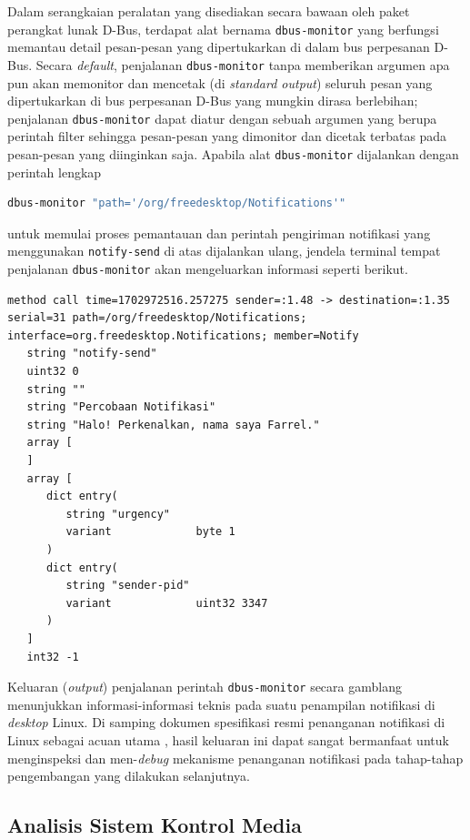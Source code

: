 Dalam serangkaian peralatan yang disediakan secara bawaan oleh paket perangkat lunak D-Bus, terdapat alat bernama \verb|dbus-monitor| yang berfungsi memantau detail pesan-pesan yang dipertukarkan di dalam bus perpesanan D-Bus. Secara \textit{default}, penjalanan \verb|dbus-monitor| tanpa memberikan argumen apa pun akan memonitor dan mencetak (di \textit{standard output}) seluruh pesan yang dipertukarkan di bus perpesanan D-Bus yang mungkin dirasa berlebihan; penjalanan \verb|dbus-monitor| dapat diatur dengan sebuah argumen yang berupa perintah filter sehingga pesan-pesan yang dimonitor dan dicetak terbatas pada pesan-pesan yang diinginkan saja. Apabila alat \verb|dbus-monitor| dijalankan dengan perintah lengkap
\begin{lstlisting}[language=bash]
    dbus-monitor "path='/org/freedesktop/Notifications'"
\end{lstlisting}
untuk memulai proses pemantauan dan perintah pengiriman notifikasi yang menggunakan \verb|notify-send| di atas dijalankan ulang, jendela terminal tempat penjalanan \verb|dbus-monitor| akan mengeluarkan informasi seperti berikut.
\begin{lstlisting}
method call time=1702972516.257275 sender=:1.48 -> destination=:1.35 serial=31 path=/org/freedesktop/Notifications; interface=org.freedesktop.Notifications; member=Notify
   string "notify-send"
   uint32 0
   string ""
   string "Percobaan Notifikasi"
   string "Halo! Perkenalkan, nama saya Farrel."
   array [
   ]
   array [
      dict entry(
         string "urgency"
         variant             byte 1
      )
      dict entry(
         string "sender-pid"
         variant             uint32 3347
      )
   ]
   int32 -1
\end{lstlisting}

Keluaran (\textit{output}) penjalanan perintah \verb|dbus-monitor| secara gamblang menunjukkan informasi-informasi teknis pada suatu penampilan notifikasi di \textit{desktop} Linux. Di samping dokumen spesifikasi resmi penanganan notifikasi di Linux sebagai acuan utama \cite{xdg-desktop-notifications-specification}, hasil keluaran ini dapat sangat bermanfaat untuk menginspeksi dan men-\textit{debug} mekanisme penanganan notifikasi pada tahap-tahap pengembangan yang dilakukan selanjutnya.

\subsection{Analisis Sistem Kontrol Media}

